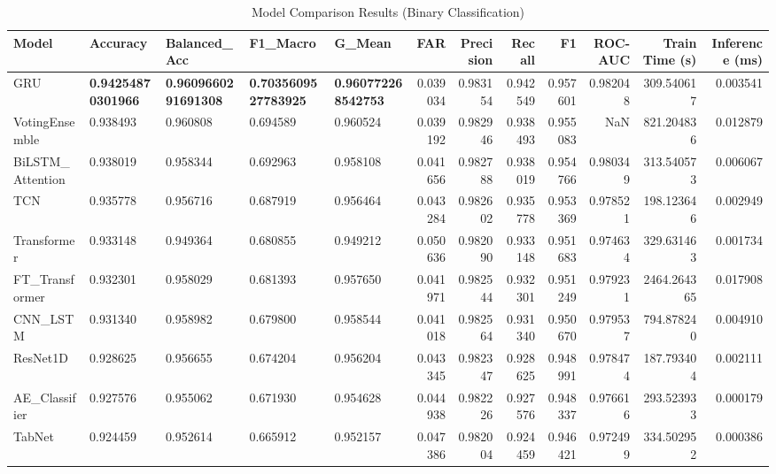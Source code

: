 \begin{table}
\caption{Model Comparison Results (Binary Classification)}
\label{tab:model_comparison_binary}
\begin{tabular}{lllllrrrrrrr}
\toprule
Model & Accuracy & Balanced_Acc & F1_Macro & G_Mean & FAR & Precision & Recall & F1 & ROC-AUC & Train Time (s) & Inference (ms) \\
\midrule
GRU & \textbf{0.94254870301966} & \textbf{0.9609660291691308} & \textbf{0.7035609527783925} & \textbf{0.960772268542753} & 0.039034 & 0.983154 & 0.942549 & 0.957601 & 0.982048 & 309.540617 & 0.003541 \\
VotingEnsemble & 0.938493 & 0.960808 & 0.694589 & 0.960524 & 0.039192 & 0.982946 & 0.938493 & 0.955083 & NaN & 821.204836 & 0.012879 \\
BiLSTM_Attention & 0.938019 & 0.958344 & 0.692963 & 0.958108 & 0.041656 & 0.982788 & 0.938019 & 0.954766 & 0.980349 & 313.540573 & 0.006067 \\
TCN & 0.935778 & 0.956716 & 0.687919 & 0.956464 & 0.043284 & 0.982602 & 0.935778 & 0.953369 & 0.978521 & 198.123646 & 0.002949 \\
Transformer & 0.933148 & 0.949364 & 0.680855 & 0.949212 & 0.050636 & 0.982090 & 0.933148 & 0.951683 & 0.974634 & 329.631463 & 0.001734 \\
FT_Transformer & 0.932301 & 0.958029 & 0.681393 & 0.957650 & 0.041971 & 0.982544 & 0.932301 & 0.951249 & 0.979231 & 2464.264365 & 0.017908 \\
CNN_LSTM & 0.931340 & 0.958982 & 0.679800 & 0.958544 & 0.041018 & 0.982564 & 0.931340 & 0.950670 & 0.979537 & 794.878240 & 0.004910 \\
ResNet1D & 0.928625 & 0.956655 & 0.674204 & 0.956204 & 0.043345 & 0.982347 & 0.928625 & 0.948991 & 0.978474 & 187.793404 & 0.002111 \\
AE_Classifier & 0.927576 & 0.955062 & 0.671930 & 0.954628 & 0.044938 & 0.982226 & 0.927576 & 0.948337 & 0.976616 & 293.523933 & 0.000179 \\
TabNet & 0.924459 & 0.952614 & 0.665912 & 0.952157 & 0.047386 & 0.982004 & 0.924459 & 0.946421 & 0.972499 & 334.502952 & 0.000386 \\
\bottomrule
\end{tabular}
\end{table}
